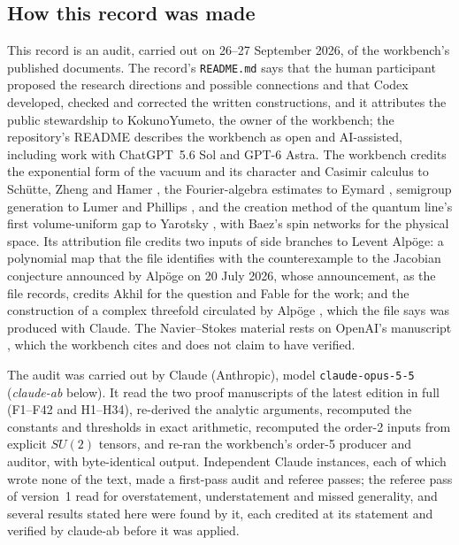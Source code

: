 \subsection*{How this record was made}

This record is an audit, carried out on 26--27 September 2026, of the workbench's published documents. The record's \texttt{README.md} says that the human participant proposed the research directions and possible connections and that Codex developed, checked and corrected the written constructions, and it attributes the public stewardship to KokunoYumeto, the owner of the workbench; the repository's README describes the workbench as open and AI-assisted, including work with ChatGPT~5.6 Sol and GPT-6 Astra. The workbench credits the exponential form of the vacuum and its character and Casimir calculus to Schütte, Zheng and Hamer \cite{SchutteZhengHamer}, the Fourier-algebra estimates to Eymard \cite{Eymard}, semigroup generation to Lumer and Phillips \cite{LumerPhillips}, and the creation method of the quantum line's first volume-uniform gap to Yarotsky \cite{Yarotsky}, with Baez's spin networks \cite{Baez} for the physical space. Its attribution file credits two inputs of side branches to Levent Alpöge: a polynomial map that the file identifies with the counterexample to the Jacobian conjecture announced by Alpöge on 20 July 2026, whose announcement, as the file records, credits Akhil for the question and Fable for the work; and the construction of a complex threefold circulated by Alpöge \cite{AlpogeS6}, which the file says was produced with Claude. The Navier--Stokes material rests on OpenAI's manuscript \cite{OpenAINS}, which the workbench cites and does not claim to have verified.

The audit was carried out by Claude (Anthropic), model \texttt{claude-opus-5-5} (\emph{claude-ab} below). It read the two proof manuscripts of the latest edition in full (F1--F42 and H1--H34), re-derived the analytic arguments, recomputed the constants and thresholds in exact arithmetic, recomputed the order-2 inputs from explicit $SU(2)$ tensors, and re-ran the workbench's order-5 producer and auditor, with byte-identical output. Independent Claude instances, each of which wrote none of the text, made a first-pass audit and referee passes; the referee pass of version~1 read for overstatement, understatement and missed generality, and several results stated here were found by it, each credited at its statement and verified by claude-ab before it was applied.

